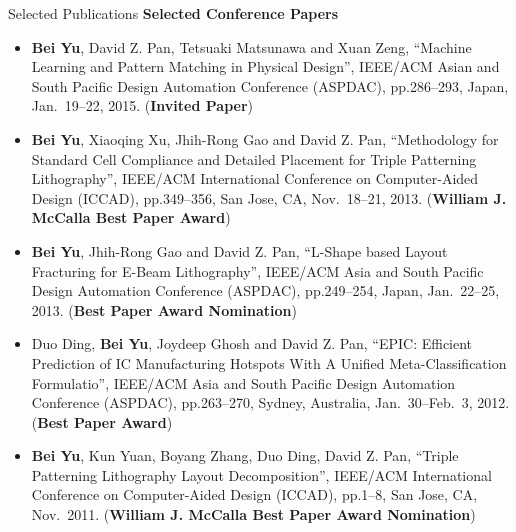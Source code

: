 \begin{rSection}{Selected Publications}
\textbf{Selected Conference Papers}
\begin{itemize}[font=\normalfont]
\item{
    \textbf{Bei Yu}, David Z. Pan, Tetsuaki Matsunawa and Xuan Zeng,
    ``Machine Learning and Pattern Matching in Physical Design'',
    IEEE/ACM Asian and South Pacific Design Automation Conference (ASPDAC), pp.286--293, Japan, Jan.~19--22, 2015.
    (\textbf{Invited Paper})
}
\item{
    \textbf{Bei Yu}, Xiaoqing Xu, Jhih-Rong Gao and David Z. Pan,
    ``Methodology for Standard Cell Compliance and Detailed Placement for Triple Patterning Lithography'',
    IEEE/ACM International Conference on Computer-Aided Design (ICCAD), pp.349--356, San Jose, CA, Nov.~18--21, 2013.
    (\textbf{William J. McCalla Best Paper Award})
}
\item{
    \textbf{Bei Yu}, Jhih-Rong Gao and David Z. Pan,
    ``L-Shape based Layout Fracturing for E-Beam Lithography'',
    IEEE/ACM Asia and South Pacific Design Automation Conference (ASPDAC), pp.249--254, Japan, Jan.~22--25, 2013.
    (\textbf{Best Paper Award Nomination})
}
\item{
    Duo Ding, \textbf{Bei Yu}, Joydeep Ghosh and David Z. Pan,
	``EPIC: Efficient Prediction of IC Manufacturing Hotspots With A Unified Meta-Classification Formulatio'',
	IEEE/ACM Asia and South Pacific Design Automation Conference (ASPDAC), pp.263--270, Sydney, Australia, Jan.~30--Feb.~3, 2012.
	(\textbf{Best Paper Award})
}
\item{
    \textbf{Bei Yu}, Kun Yuan, Boyang Zhang, Duo Ding, David Z. Pan,
    ``Triple Patterning Lithography Layout Decomposition'',
    IEEE/ACM International Conference on Computer-Aided Design (ICCAD), pp.1--8, San Jose, CA, Nov.~2011.
    (\textbf{William J. McCalla Best Paper Award Nomination})
}
\end{itemize}


\end{rSection}

